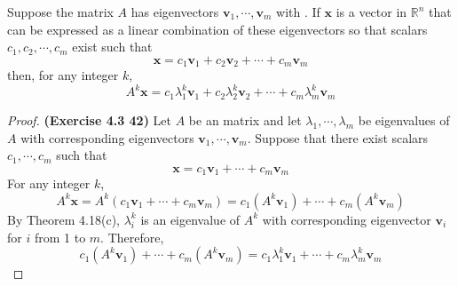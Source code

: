 \begin{theorem}
	Suppose the \nbyn matrix $ A $ has eigenvectors $\textbf{v}_1, \cdots, \textbf{v}_m$ with \lamm. If $ \textbf{x} $ is a vector in $\mathbb{R}^n$ that can be expressed as a linear combination of these eigenvectors so that scalars $c_1, c_2, \cdots, c_m$ exist such that
	$$ \textbf{x}=c_{1}\textbf{v}_{1} + c_{2}\textbf{v}_{2} + \cdots +  c_{m}\textbf{v}_{m} $$
	then, for any integer $ k $, 
	$$ A^{k}\textbf{x}=c_{1}\lambda_{1}^{k}\textbf{v}_{1} + c_{2}\lambda_{2}^{k}\textbf{v}_{2} + \cdots + c_{m}\lambda_{m}^{k}\textbf{v}_{m}$$
\end{theorem}
\begin{proof}
	\textbf{(Exercise 4.3 42)} Let $A$ be an \nbyn matrix and let $\lambda_1, \cdots, \lambda_m$ be eigenvalues of $A$ with corresponding eigenvectors $\textbf{v}_1, \cdots, \textbf{v}_m$. Suppose that there exist scalars $c_1, \cdots, c_m$ such that \begin{equation*}
		\textbf{x} = c_1\textbf{v}_1 + \cdots + c_m\textbf{v}_m
	\end{equation*}
	For any integer $k$, \begin{equation*}
		A^k\textbf{x} = A^k(c_1\textbf{v}_1 + \cdots + c_m\textbf{v}_m) = c_1(A^k\textbf{v}_1) + \cdots + c_m(A^k\textbf{v}_m)
	\end{equation*}
	By Theorem 4.18(c), $\lambda_i^k$ is an eigenvalue of $A^k$ with corresponding eigenvector $\textbf{v}_i$ for $i$ from 1 to $m$. Therefore, \begin{equation*}
		c_1(A^k\textbf{v}_1) + \cdots + c_m(A^k\textbf{v}_m) =
		c_1\lambda_1^k\textbf{v}_1 + \cdots + c_m\lambda_m^k\textbf{v}_m
	\end{equation*}
\end{proof}

